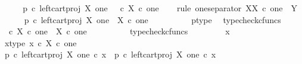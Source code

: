 \begin{isabellebody}
\isatagproof
{}\isamarkupfalse%
\ {\isacharminus}{\kern0pt}\isanewline
\ \ \isamarkupfalse%
\ {\isachardoublequoteopen}p\ {\isasymcirc}\isactrlsub c\ left{\isacharunderscore}{\kern0pt}cart{\isacharunderscore}{\kern0pt}proj\ X\ one\ {\isacharequal}{\kern0pt}\ {\isasymt}\ {\isasymcirc}\isactrlsub c\ {\isasymbeta}\isactrlbsub X\ {\isasymtimes}\isactrlsub c\ one\isactrlesub {\isachardoublequoteclose}\isanewline
\ \ \isamarkupfalse%
\ {\isacharparenleft}{\kern0pt}rule\ one{\isacharunderscore}{\kern0pt}separator{\isacharbrackleft}{\kern0pt}\ X{\isacharequal}{\kern0pt}{\isachardoublequoteopen}X\ {\isasymtimes}\isactrlsub c\ one{\isachardoublequoteclose}{\isacharcomma}{\kern0pt}\ \ Y{\isacharequal}{\kern0pt}{\isachardoublequoteopen}{\isasymOmega}{\isachardoublequoteclose}{\isacharbrackright}{\kern0pt}{\isacharparenright}{\kern0pt}\isanewline
\ \ \ \ \isamarkupfalse%
\ {\isachardoublequoteopen}p\ {\isasymcirc}\isactrlsub c\ left{\isacharunderscore}{\kern0pt}cart{\isacharunderscore}{\kern0pt}proj\ X\ one\ {\isacharcolon}{\kern0pt}\ X\ {\isasymtimes}\isactrlsub c\ one\ {\isasymrightarrow}\ {\isasymOmega}{\isachardoublequoteclose}\isanewline
\ \ \ \ \ \ \isamarkupfalse%
\ p{\isacharunderscore}{\kern0pt}type\ \isamarkupfalse%
\ typecheck{\isacharunderscore}{\kern0pt}cfuncs\isanewline
\ \ \ \ \isamarkupfalse%
\ {\isachardoublequoteopen}{\isasymt}\ {\isasymcirc}\isactrlsub c\ {\isasymbeta}\isactrlbsub X\ {\isasymtimes}\isactrlsub c\ one\isactrlesub \ {\isacharcolon}{\kern0pt}\ X\ {\isasymtimes}\isactrlsub c\ one\ {\isasymrightarrow}\ {\isasymOmega}{\isachardoublequoteclose}\isanewline
\ \ \ \ \ \ \isamarkupfalse%
\ typecheck{\isacharunderscore}{\kern0pt}cfuncs\isanewline
\ \ \isamarkupfalse%
\isanewline
\ \ \ \ \isamarkupfalse%
\ x\isanewline
\ \ \ \ \isamarkupfalse%
\ x{\isacharunderscore}{\kern0pt}type{\isacharcolon}{\kern0pt}\ {\isachardoublequoteopen}x\ {\isasymin}\isactrlsub c\ X\ {\isasymtimes}\isactrlsub c\ one{\isachardoublequoteclose}\isanewline
\isanewline
\ \ \ \ \isamarkupfalse%
\ {\isachardoublequoteopen}{\isacharparenleft}{\kern0pt}p\ {\isasymcirc}\isactrlsub c\ left{\isacharunderscore}{\kern0pt}cart{\isacharunderscore}{\kern0pt}proj\ X\ one{\isacharparenright}{\kern0pt}\ {\isasymcirc}\isactrlsub c\ x\ {\isacharequal}{\kern0pt}\ p\ {\isasymcirc}\isactrlsub c\ {\isacharparenleft}{\kern0pt}left{\isacharunderscore}{\kern0pt}cart{\isacharunderscore}{\kern0pt}proj\ X\ one\ {\isasymcirc}\isactrlsub c\ x{\isacharparenright}{\kern0pt}{\isachardoublequoteclose}\isanewline

\end{isabellebody}
